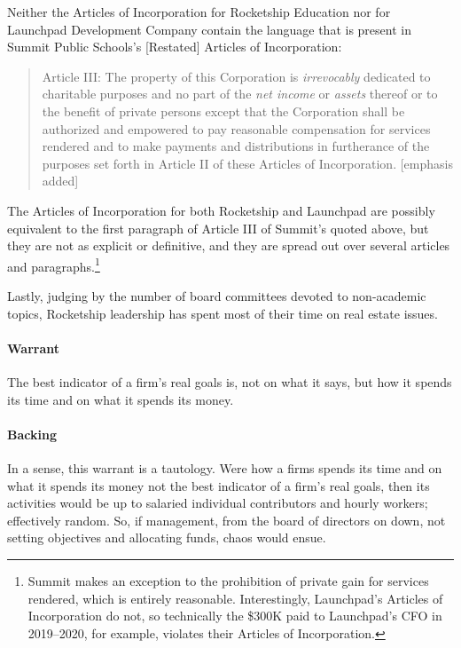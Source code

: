 Neither the Articles of Incorporation for Rocketship Education nor for Launchpad Development Company contain the language that is present in Summit Public Schools's [Restated] Articles of Incorporation:
\begin{quotation}\noindent%
Article III: The property of this Corporation is \textit{irrevocably} dedicated to charitable purposes and no part of the \textit{net income} or \textit{assets} thereof or to the benefit of private persons except that the Corporation shall be authorized and empowered to pay reasonable compensation for services rendered and to make payments and distributions in furtherance of the purposes set forth in Article II of these Articles of Incorporation. [emphasis added]
\end{quotation}
The Articles of Incorporation for both Rocketship and Launchpad are possibly equivalent to the first paragraph of Article III of Summit's quoted above, but they are not as explicit or definitive, and they are spread out over several articles and paragraphs.\footnote{Summit makes an exception to the prohibition of private gain for services rendered, which is entirely reasonable. Interestingly, Launchpad's Articles of Incorporation do not, so technically the \$300K paid to Launchpad's CFO \parencite[7]{zotero-16512} in 2019–2020, for example, violates their Articles of Incorporation.}

Lastly, judging by the number of board committees devoted to non-academic topics, Rocketship leadership has spent most of their time on real estate issues.

\paragraph{Warrant}
The best indicator of a firm's real goals is, not on what it says, but how it spends its time and on what it spends its money.

\paragraph{Backing}
In a sense, this warrant is a tautology. Were how a firms spends its time and on what it spends its money not the best indicator of a firm's real goals, then its activities would be up to salaried individual contributors and hourly workers; effectively random. So, if management, from the board of directors on down, not setting objectives and allocating funds, chaos would ensue.

